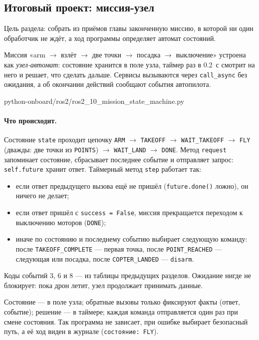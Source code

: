 \subsection{Итоговый проект: миссия-узел}
\label{sec:ros2-project}

Цель раздела: собрать из приёмов главы законченную миссию, в которой ни один обработчик не ждёт, а ход программы определяет автомат состояний.

Миссия «arm $\to$ взлёт $\to$ две точки $\to$ посадка $\to$ выключение» устроена как \emph{узел-автомат}: состояние хранится в поле узла, таймер раз в 0.2~с смотрит на него и решает, что сделать дальше. Сервисы вызываются через \verb|call_async| без ожидания, а об окончании действий сообщают события автопилота.

\begin{codefile}[python]{python-onboard/ros2/ros2_10_mission_state_machine.py}
\end{codefile}

\paragraph{Что происходит.} Состояние \verb|state| проходит цепочку \verb|ARM| $\to$ \verb|TAKEOFF| $\to$ \verb|WAIT_TAKEOFF| $\to$ \verb|FLY| (дважды: две точки из \verb|POINTS|) $\to$ \verb|WAIT_LAND| $\to$ \verb|DONE|. Метод \verb|request| запоминает состояние, сбрасывает последнее событие и отправляет запрос: \verb|self.future| хранит ответ. Таймерный метод \verb|step| работает так:
\begin{itemize}
    \item если ответ предыдущего вызова ещё не пришёл (\verb|future.done()| ложно), он ничего не делает;
    \item если ответ пришёл с \verb|success = False|, миссия прекращается переходом к выключению моторов (\verb|DONE|);
    \item иначе по состоянию и последнему событию выбирает следующую команду: после \verb|TAKEOFF_COMPLETE| --- первая точка, после \verb|POINT_REACHED| --- следующая или посадка, после \verb|COPTER_LANDED| --- \verb|disarm|.
\end{itemize}
Коды событий 3, 6 и 8 --- из таблицы предыдущих разделов. Ожидание нигде не блокирует: пока дрон летит, узел продолжает принимать данные.

\begin{rulebox}
Состояние --- в поле узла; обратные вызовы только фиксируют факты (ответ, событие); решение --- в таймере; каждая команда отправляется один раз при смене состояния. Так программа не зависает, при ошибке выбирает безопасный путь, а её ход виден в журнале (\verb|состояние: FLY|).
\end{rulebox}

